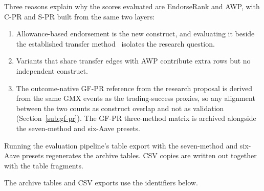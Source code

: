 Three reasons explain why the scores evaluated are EndorseRank and AWP, with C-PR and S-PR built from the same two layers:

\begin{enumerate}
\item Allowance-based endorsement is the new construct, and evaluating it beside the established transfer method~ isolates the research question.
\item Variants that share transfer edges with AWP contribute extra rows but no independent construct.
\item The outcome-native GF-PR reference from the research proposal is derived from the same GMX events as the trading-success proxies, so any alignment between the two counts as construct overlap and not as validation (Section~\ref{sub:gf-pr}). The GF-PR three-method matrix is archived alongside the seven-method and six-Aave presets.
\end{enumerate}


Running the evaluation pipeline's table export with the seven-method and six-Aave presets regenerates the archive tables. CSV copies are written out together with the table fragments.


The archive tables and CSV exports use the identifiers below.


